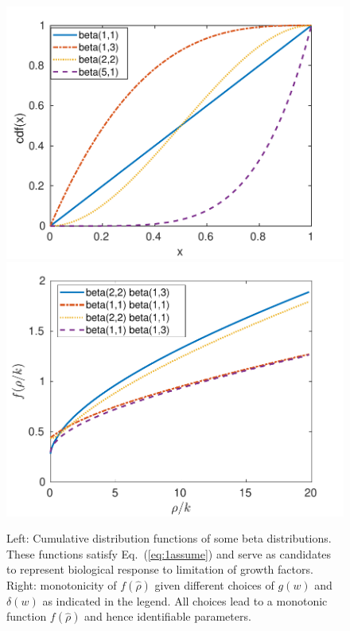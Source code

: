 \documentclass{aims}
\numberwithin{equation}{section}
\begin{document}
\begin{figure}
\begin{center}
\includegraphics[scale=0.5]{plots/frhok/betas-new}
\includegraphics[scale=0.5]{plots/frhok/frhok-new}
\end{center}
\caption{Left: Cumulative distribution functions of some beta distributions. These
functions satisfy Eq.~(\ref{eq:1assume})  and serve as candidates to represent
biological response to limitation of growth factors. Right:
monotonicity of $f(\hat\rho)$ given different choices of $g(w)$ and $\delta(w)$ as
indicated in the legend. All choices lead to a monotonic function $f(\hat\rho)$ and hence
identifiable parameters.}
\label{fig:beta26f}
\end{figure}
\end{document}

